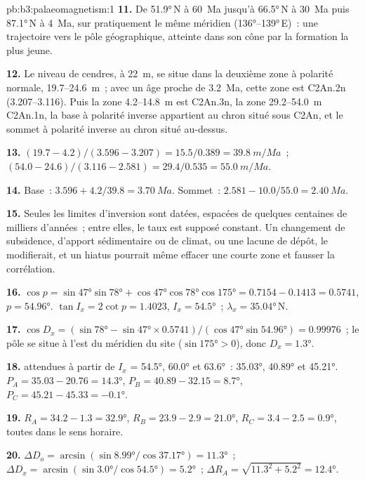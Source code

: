 \begin{solution}{pb:b3:palaeomagnetism:1}
\textbf{11.} De \ang{51.9}\,N à \qty{60}{Ma} jusqu'à \ang{66.5}\,N à
\qty{30}{Ma} puis \ang{87.1}\,N à \qty{4}{Ma}, sur pratiquement le même méridien
(\ang{136}--\ang{139}\,E)~: une trajectoire vers le pôle géographique, atteinte dans
son cône par la formation la plus jeune.

\textbf{12.} Le niveau de cendres, à \qty{22}{m}, se situe dans la deuxième zone à polarité normale,
19.7--\qty{24.6}{m}~; avec un âge proche de \qty{3.2}{Ma}, cette zone est C2An.2n
(3.207--3.116). Puis la zone 4.2--\qty{14.8}{m} est C2An.3n, la zone
29.2--\qty{54.0}{m} C2An.1n, la base à polarité inverse appartient au chron situé sous
C2An, et le sommet à polarité inverse au chron situé au-dessus.

\textbf{13.} $(19.7 - 4.2)/(3.596 - 3.207) = 15.5/0.389 = \qty{39.8}{m/Ma}$~;
$(54.0 - 24.6)/(3.116 - 2.581) = 29.4/0.535 = \qty{55.0}{m/Ma}$.

\textbf{14.} Base~: $3.596 + 4.2/39.8 = \qty{3.70}{Ma}$. Sommet~: $2.581 -
10.0/55.0 = \qty{2.40}{Ma}$.

\textbf{15.} Seules les limites d'inversion sont datées, espacées de quelques centaines de milliers
d'années~; entre elles, le taux est supposé constant. Un changement de subsidence,
d'apport sédimentaire ou de climat, ou une lacune de dépôt, le modifierait, et un
hiatus pourrait même effacer une courte zone et fausser la corrélation.

\textbf{16.} $\cos p = \sin\ang{47}\sin\ang{78} + \cos\ang{47}\cos\ang{78}
\cos\ang{175} = 0.7154 - 0.1413 = 0.5741$, $p = \ang{54.96}$. $\tan I_x =
2\cot p = 1.4023$, $I_x = \ang{54.5}$~; $\lambda_x = \ang{35.04}$\,N.

\textbf{17.} $\cos D_x = (\sin\ang{78} - \sin\ang{47}\times0.5741)/
(\cos\ang{47}\sin\ang{54.96}) = 0.99976$~; le pôle se situe à l'est du
méridien du site ($\sin\ang{175} > 0$), donc $D_x = \ang{1.3}$.

\textbf{18.}  attendues à partir de $I_x$ = \ang{54.5}, \ang{60.0} et
\ang{63.6}~: \ang{35.03}, \ang{40.89} et \ang{45.21}. $P_A = 35.03 - 20.76 =
\ang{14.3}$, $P_B = 40.89 - 32.15 = \ang{8.7}$, $P_C = 45.21 - 45.33 =
\ang{-0.1}$.

\textbf{19.} $R_A = 34.2 - 1.3 = \ang{32.9}$, $R_B = 23.9 - 2.9 = \ang{21.0}$,
$R_C = 3.4 - 2.5 = \ang{0.9}$, toutes dans le sens horaire.

\textbf{20.} $\Delta D_o = \arcsin(\sin\ang{8.99}/\cos\ang{37.17}) = \ang{11.3}$~;
$\Delta D_x = \arcsin(\sin\ang{3.0}/\cos\ang{54.5}) = \ang{5.2}$~; $\Delta R_A =
\sqrt{11.3^2 + 5.2^2} = \ang{12.4}$.


\end{solution}
